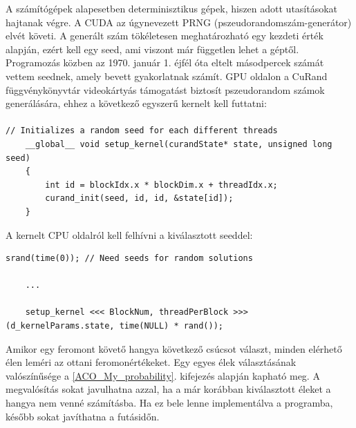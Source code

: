 A számítógépek alapesetben determinisztikus gépek, hiszen adott utasításokat hajtanak végre. A CUDA az úgynevezett PRNG (pszeudorandomszám-generátor) elvét követi. A generált szám tökéletesen meghatározható egy kezdeti érték alapján, ezért kell egy \mbox{seed}, ami viszont már független lehet a géptől. Programozás közben az 1970. január 1. éjfél óta eltelt másodpercek számát vettem seednek, amely bevett gyakorlatnak számít.
GPU oldalon a CuRand függvénykönyvtár videokártyás támogatást biztosít pszeudorandom számok generálására, ehhez a következő egyszerű kernelt kell futtatni:

\paragraph{}
\noindent

\begin{lstlisting}[style=CStyle]
	// Initializes a random seed for each different threads
	__global__ void setup_kernel(curandState* state, unsigned long seed)
	{
		int id = blockIdx.x * blockDim.x + threadIdx.x;
		curand_init(seed, id, id, &state[id]);
	}
\end{lstlisting}

\noindent
A kernelt CPU oldalról kell felhívni a kiválasztott seeddel:

\begin{lstlisting}[style=CStyle]
	srand(time(0)); // Need seeds for random solutions
	
	...
	
	setup_kernel <<< BlockNum, threadPerBlock >>> (d_kernelParams.state, time(NULL) * rand());
\end{lstlisting}

Amikor egy feromont követő hangya következő csúcsot választ, minden elérhető élen leméri az ottani feromonértékeket. Egy egyes élek választásának valószínűsége a \ref{ACO_My_probability}. kifejezés alapján kapható meg. A megvalósítás sokat javulhatna azzal, ha a már korábban kiválasztott éleket a hangya nem venné számításba. Ha ez bele lenne implementálva a programba, később sokat javíthatna a futásidőn.


